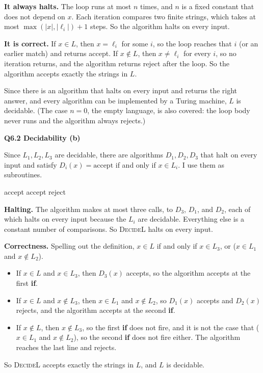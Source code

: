 \documentclass[11pt]{article}
\newcommand{\abs}[1]{\left|#1\right|}
\newcommand{\algo}[1]{\textsc{#1}}
\newcommand{\qpage}[1]{\clearpage\noindent\textbf{\large #1}\par\medskip}
\begin{document}
\textbf{It always halts.}
The loop runs at most $n$ times, and $n$ is a fixed constant that does not depend on $x$.
Each iteration compares two finite strings, which takes at most $\max(\abs{x}, \abs{\ell_i}) + 1$ steps.
So the algorithm halts on every input.

\textbf{It is correct.}
If $x \in L$, then $x = \ell_i$ for some $i$, so the loop reaches that $i$ (or an earlier match) and returns accept.
If $x \notin L$, then $x \ne \ell_i$ for every $i$, so no iteration returns, and the algorithm returns reject after the loop.
So the algorithm accepts exactly the strings in $L$.

Since there is an algorithm that halts on every input and returns the right answer, and every algorithm can be implemented by a Turing machine, $L$ is decidable.
(The case $n = 0$, the empty language, is also covered: the loop body never runs and the algorithm always rejects.)

\qpage{Q6.2 Decidability (b)}

Since $L_1, L_2, L_3$ are decidable, there are algorithms $D_1, D_2, D_3$ that halt on every input and satisfy $D_i(x) = \text{accept}$ if and only if $x \in L_i$.
I use them as subroutines.

\begin{algorithmic}[1]
      \State \Return accept
    \EndIf
      \State \Return accept
    \EndIf
    \State \Return reject
  \EndFunction
\end{algorithmic}

\textbf{Halting.}
The algorithm makes at most three calls, to $D_3$, $D_1$, and $D_2$, each of which halts on every input because the $L_i$ are decidable.
Everything else is a constant number of comparisons.
So \algo{DecideL} halts on every input.

\textbf{Correctness.}
Spelling out the definition, $x \in L$ if and only if $x \in L_3$, or ($x \in L_1$ and $x \notin L_2$).
\begin{itemize}
  \item If $x \in L$ and $x \in L_3$, then $D_3(x)$ accepts, so the algorithm accepts at the first \textbf{if}.
  \item If $x \in L$ and $x \notin L_3$, then $x \in L_1$ and $x \notin L_2$, so $D_1(x)$ accepts and $D_2(x)$ rejects, and the algorithm accepts at the second \textbf{if}.
  \item If $x \notin L$, then $x \notin L_3$, so the first \textbf{if} does not fire, and it is not the case that ($x \in L_1$ and $x \notin L_2$), so the second \textbf{if} does not fire either. The algorithm reaches the last line and rejects.
\end{itemize}
So \algo{DecideL} accepts exactly the strings in $L$, and $L$ is decidable.
\end{document}
